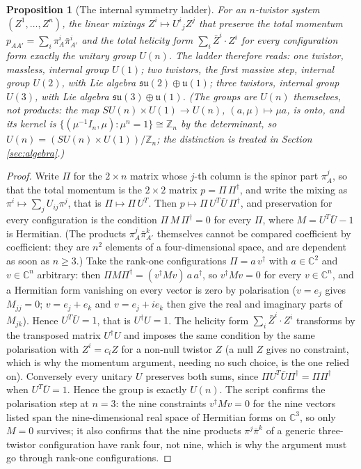 \documentclass[11pt]{article}
\newtheorem{proposition}[theorem]{Proposition}
\theoremstyle{definition}
\newcommand{\C}{\mathbb{C}}
\newcommand{\su}{\mathfrak{su}}
\newcommand{\uu}{\mathfrak{u}}
\begin{document}
\begin{proposition}[The internal symmetry ladder]\label{prop:ladder}
For an $n$-twistor system $(Z^{1}, \ldots, Z^{n})$, the linear mixings $Z^{i} \mapsto U^{i}{}_{j} Z^{j}$ that preserve the total momentum $p_{AA'} = \sum_{i} \pi^{i}_{A}\bar\pi^{i}_{A'}$ and the total helicity form $\sum_{i} \bar{Z}^{i} \cdot Z^{i}$ for every configuration form exactly the unitary group $U(n)$. The ladder therefore reads: one twistor, massless, internal group $U(1)$; two twistors, the first massive step, internal group $U(2)$, with Lie algebra $\su(2) \oplus \uu(1)$; three twistors, internal group $U(3)$, with Lie algebra $\su(3) \oplus \uu(1)$. (The groups are $U(n)$ themselves, not products: the map $SU(n) \times U(1) \to U(n)$, $(a, \mu) \mapsto \mu a$, is onto, and its kernel is $\{(\mu^{-1}I_{n}, \mu) : \mu^{n} = 1\} \cong \mathbb{Z}_{n}$ by the determinant, so $U(n) = (SU(n) \times U(1))/\mathbb{Z}_{n}$; the distinction is treated in Section \ref{sec:algebra}.)
\end{proposition}

\begin{proof}
Write $\Pi$ for the $2 \times n$ matrix whose $j$-th column is the spinor part $\pi^{j}_{A}$, so that the total momentum is the $2 \times 2$ matrix $p = \Pi\,\Pi^{\dagger}$, and write the mixing as $\pi^{i} \mapsto \sum_{j} U_{ij}\pi^{j}$, that is $\Pi \mapsto \Pi\,U^{T}$. Then $p \mapsto \Pi\,U^{T}\bar{U}\,\Pi^{\dagger}$, and preservation for every configuration is the condition $\Pi\,M\,\Pi^{\dagger} = 0$ for every $\Pi$, where $M = U^{T}\bar{U} - 1$ is Hermitian. (The products $\pi^{j}_{A}\bar\pi^{k}_{A'}$ themselves cannot be compared coefficient by coefficient: they are $n^{2}$ elements of a four-dimensional space, and are dependent as soon as $n \ge 3$.) Take the rank-one configurations $\Pi = a\,v^{\dagger}$ with $a \in \C^{2}$ and $v \in \C^{n}$ arbitrary: then $\Pi M \Pi^{\dagger} = (v^{\dagger}Mv)\,a\,a^{\dagger}$, so $v^{\dagger}Mv = 0$ for every $v \in \C^{n}$, and a Hermitian form vanishing on every vector is zero by polarisation ($v = e_{j}$ gives $M_{jj} = 0$; $v = e_{j} + e_{k}$ and $v = e_{j} + ie_{k}$ then give the real and imaginary parts of $M_{jk}$). Hence $U^{T}\bar{U} = 1$, that is $U^{\dagger}U = 1$. The helicity form $\sum_{i}\bar{Z}^{i}\cdot Z^{i}$ transforms by the transposed matrix $U^{\dagger}U$ and imposes the same condition by the same polarisation with $Z^{i} = c_{i}Z$ for a non-null twistor $Z$ (a null $Z$ gives no constraint, which is why the momentum argument, needing no such choice, is the one relied on). Conversely every unitary $U$ preserves both sums, since $\Pi U^{T}\bar{U}\Pi^{\dagger} = \Pi\Pi^{\dagger}$ when $U^{T}\bar{U} = 1$. Hence the group is exactly $U(n)$. The script confirms the polarisation step at $n = 3$: the nine constraints $v^{\dagger}Mv = 0$ for the nine vectors listed span the nine-dimensional real space of Hermitian forms on $\C^{3}$, so only $M = 0$ survives; it also confirms that the nine products $\pi^{j}\bar\pi^{k}$ of a generic three-twistor configuration have rank four, not nine, which is why the argument must go through rank-one configurations.
\end{proof}
\end{document}
